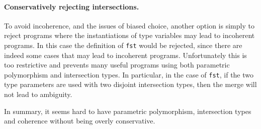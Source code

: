 \paragraph{Conservatively rejecting intersections.}
To avoid incoherence, and the issues of biased choice, another option
is simply to reject programs where the
instantiations of type variables may lead to incoherent programs.
In this case the definition of \lstinline$fst$ would be rejected, since there
are indeed some cases that may lead to incoherent programs.
Unfortunately this is too restrictive and prevents many useful
programs using both parametric polymorphism and intersection types.
In particular, in the case of \lstinline{fst}, if the two type
parameters are used with two disjoint intersection
types, then the merge will not lead to ambiguity.

In summary, it seems hard to have parametric polymorphism, intersection
types and coherence without being overly conservative.


